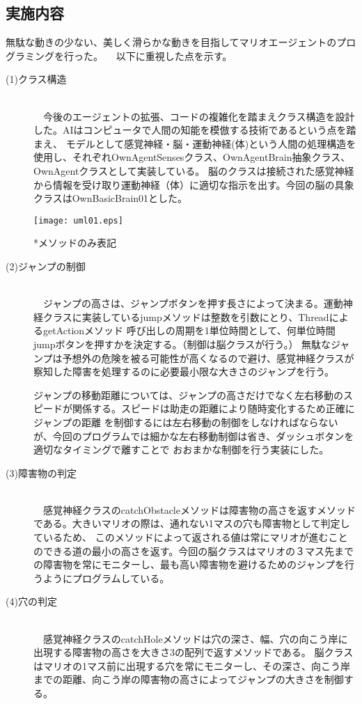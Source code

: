 \documentclass[a4j]{jarticle}
\begin{document}
\subsection{実施内容}
無駄な動きの少ない、美しく滑らかな動きを目指してマリオエージェントのプログラミングを行った。
　以下に重視した点を示す。
 \begin{description}
 
  \item[(1)クラス構造]~\\
　今後のエージェントの拡張、コードの複雑化を踏まえクラス構造を設計した。AIはコンピュータで人間の知能を模倣する技術であるという点を踏まえ、
  	モデルとして感覚神経・脳・運動神経(体)という人間の処理構造を使用し、それぞれOwnAgentSensesクラス、OwnAgentBrain抽象クラス、OwnAgentクラスとして実装している。
  	脳のクラスは接続された感覚神経から情報を受け取り運動神経（体）に適切な指示を出す。今回の脳の具象クラスはOwnBasicBrain01とした。
  	\begin{center}
		\texttt{[image: uml01.eps]}
	\end{center}
	*メソッドのみ表記
  \item[(2)ジャンプの制御] ~\\
　ジャンプの高さは、ジャンプボタンを押す長さによって決まる。運動神経クラスに実装しているjumpメソッドは整数を引数にとり、ThreadによるgetActionメソッド
	呼び出しの周期を1単位時間として、何単位時間jumpボタンを押すかを決定する。（制御は脳クラスが行う。）
	無駄なジャンプは予想外の危険を被る可能性が高くなるので避け、感覚神経クラスが察知した障害を処理するのに必要最小限な大きさのジャンプを行う。
	
	ジャンプの移動距離については、ジャンプの高さだけでなく左右移動のスピードが関係する。スピードは助走の距離により随時変化するため正確にジャンプの距離
	を制御するには左右移動の制御をしなければならないが、今回のプログラムでは細かな左右移動制御は省き、ダッシュボタンを適切なタイミングで離すことで
	おおまかな制御を行う実装にした。
	
  \item[(3)障害物の判定]~\\
　感覚神経クラスのcatchObstacleメソッドは障害物の高さを返すメソッドである。大きいマリオの際は、通れない1マスの穴も障害物として判定しているため、
このメソッドによって返される値は常にマリオが進むことのできる道の最小の高さを返す。今回の脳クラスはマリオの３マス先までの障害物を常にモニターし、最も高い障害物を避けるためのジャンプを行うようにプログラムしている。
  	
  \item[(4)穴の判定]~\\
　感覚神経クラスのcatchHoleメソッドは穴の深さ、幅、穴の向こう岸に出現する障害物の高さを大きさ3の配列で返すメソッドである。
脳クラスはマリオの1マス前に出現する穴を常にモニターし、その深さ、向こう岸までの距離、向こう岸の障害物の高さによってジャンプの大きさを制御する。
 \end{description}
\end{document}
